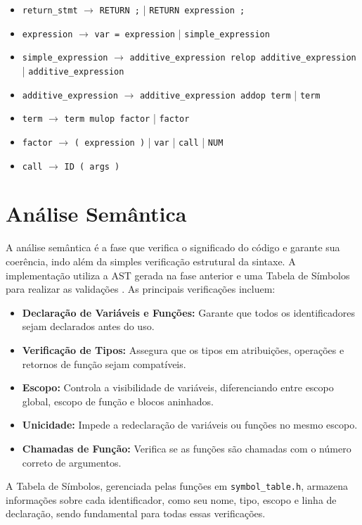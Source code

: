 \documentclass[
	12pt,				%
	oneside,
	a4paper,			%
	english,			%
	french,				%
	spanish,			%
	brazil,				%
	]{abntex2}
\begin{document}
\begin{itemize}
    \item \texttt{return\_stmt} $\rightarrow$ \texttt{RETURN ;} | \texttt{RETURN expression ;}
    \item \texttt{expression} $\rightarrow$ \texttt{var = expression} | \texttt{simple\_expression}
    \item \texttt{simple\_expression} $\rightarrow$ \texttt{additive\_expression relop additive\_expression} | \texttt{additive\_expression}
    \item \texttt{additive\_expression} $\rightarrow$ \texttt{additive\_expression addop term} | \texttt{term}
    \item \texttt{term} $\rightarrow$ \texttt{term mulop factor} | \texttt{factor}
    \item \texttt{factor} $\rightarrow$ \texttt{( expression )} | \texttt{var} | \texttt{call} | \texttt{NUM}
    \item \texttt{call} $\rightarrow$ \texttt{ID ( args )}
\end{itemize}

\section{Análise Semântica}

A análise semântica é a fase que verifica o significado do código e garante sua coerência, indo além da simples verificação estrutural da sintaxe. A implementação utiliza a AST gerada na fase anterior e uma Tabela de Símbolos para realizar as validações \cite{compiladoresLouden}. As principais verificações incluem:
\begin{itemize}
    \item \textbf{Declaração de Variáveis e Funções:} Garante que todos os identificadores sejam declarados antes do uso.
    \item \textbf{Verificação de Tipos:} Assegura que os tipos em atribuições, operações e retornos de função sejam compatíveis.
    \item \textbf{Escopo:} Controla a visibilidade de variáveis, diferenciando entre escopo global, escopo de função e blocos aninhados.
    \item \textbf{Unicidade:} Impede a redeclaração de variáveis ou funções no mesmo escopo.
    \item \textbf{Chamadas de Função:} Verifica se as funções são chamadas com o número correto de argumentos.
\end{itemize}

A Tabela de Símbolos, gerenciada pelas funções em \texttt{symbol\_table.h}, armazena informações sobre cada identificador, como seu nome, tipo, escopo e linha de declaração, sendo fundamental para todas essas verificações.
\end{document}
